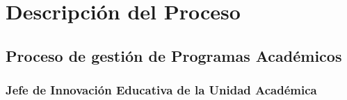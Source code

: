 \chapter{Descripción del Proceso}
\section{Proceso de gestión de Programas Académicos}
\subsection{Jefe de Innovación Educativa de la Unidad Académica}
